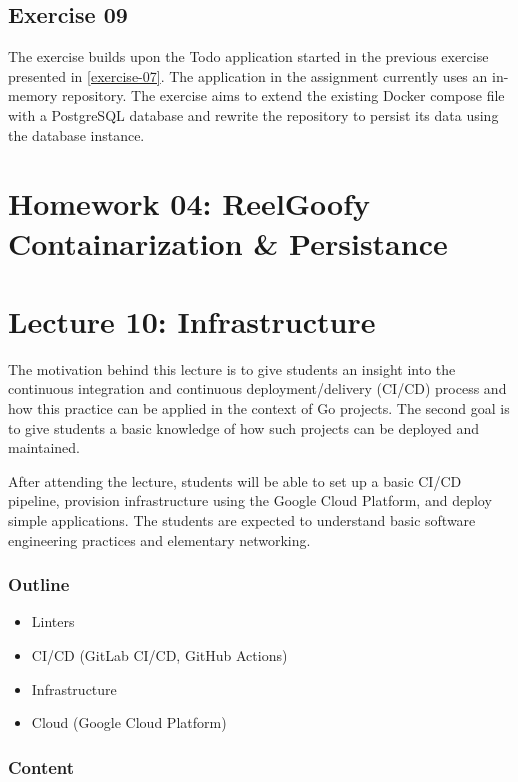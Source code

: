 \documentclass[
  digital,
  color,
  oneside,
  nosansbold,
  nocolorbold,
  nolof,
  nolot,
]{fithesis4}
\begin{document}
\subsection{Exercise 09}\label{exercise-09}

The exercise builds upon the Todo application started in the previous exercise presented in \cref{exercise-07}. The application in the assignment currently uses an in-memory repository. The exercise aims to extend the existing Docker compose file with a PostgreSQL\cite{postgres} database and rewrite the repository to persist its data using the database instance.

\section{Homework 04: ReelGoofy Containarization \& Persistance}

\section{Lecture 10: Infrastructure}\label{lecture-infrastructure}

The motivation behind this lecture is to give students an insight into the continuous integration and continuous deployment/delivery (CI/CD) process and how this practice can be applied in the context of Go projects. The second goal is to give students a basic knowledge of how such projects can be deployed and maintained.

After attending the lecture, students will be able to set up a basic CI/CD pipeline, provision infrastructure using the Google Cloud Platform, and deploy simple applications. The students are expected to understand basic software engineering practices and elementary networking.

\subsubsection{Outline}

\begin{itemize}
    \item Linters
    \item CI/CD (GitLab CI/CD, GitHub Actions)
    \item Infrastructure
    \item Cloud (Google Cloud Platform)
\end{itemize}

\subsubsection{Content}
\end{document}
